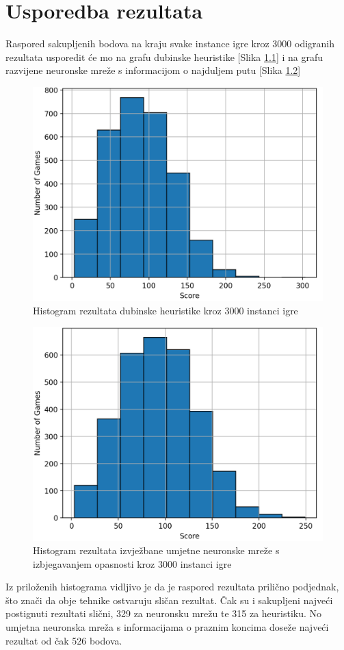 \documentclass[zavrsnirad]{fer}
\begin{document}
\chapter{Usporedba rezultata}
\label{pog:usporedba_rezultata}

Raspored sakupljenih bodova na kraju svake instance igre kroz 3000 odigranih rezultata usporedit će mo na grafu dubinske heuristike [Slika \ref{slk:heuristic_histograph}] i na grafu razvijene neuronske mreže s informacijom o najduljem putu [Slika \ref{slk:neural_histograph}]

\begin{figure}[htb]
	\centering
	\includegraphics[width=0.58\linewidth]{Figures/histoheuristic.png} 
	\caption{Histogram rezultata dubinske heuristike kroz 3000 instanci igre}
	\label{slk:heuristic_histograph}
\end{figure}

\begin{figure}[htb]
	\centering
	\includegraphics[width=0.58\linewidth]{Figures/histoneural.png} 
	\caption{Histogram rezultata izvježbane umjetne neuronske mreže s izbjegavanjem opasnosti kroz 3000 instanci igre}
	\label{slk:neural_histograph}
\end{figure}

Iz priloženih histograma vidljivo je da je raspored rezultata prilično podjednak, što znači da obje tehnike ostvaruju sličan rezultat. Čak su i sakupljeni najveći postignuti rezultati slični, 329 za neuronsku mrežu te 315 za heuristiku. No umjetna neuronska mreža s informacijama o praznim koncima doseže najveći rezultat od čak 526 bodova.
\end{document}
